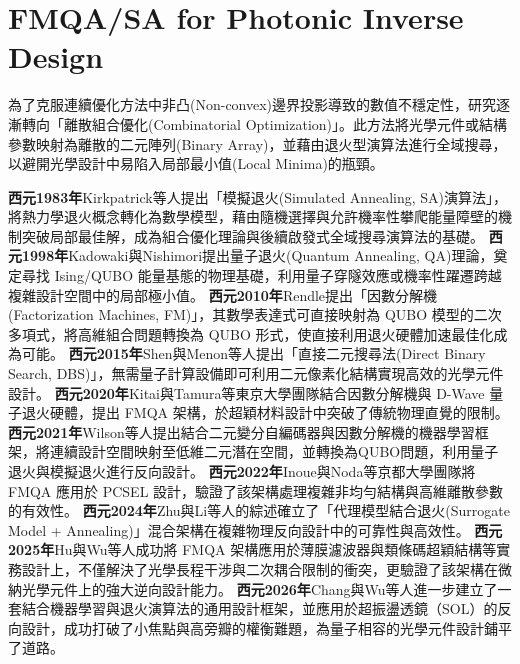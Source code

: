\section{FMQA/SA for Photonic Inverse Design}
為了克服連續優化方法中非凸(Non-convex)邊界投影導致的數值不穩定性，研究逐漸轉向「離散組合優化(Combinatorial Optimization)」。此方法將光學元件或結構參數映射為離散的二元陣列(Binary Array)，並藉由退火型演算法進行全域搜尋，以避開光學設計中易陷入局部最小值(Local Minima)的瓶頸。\

\cite{kirkpatrick1983_simulated_annealing}\textbf{西元1983年}Kirkpatrick等人提出「模擬退火(Simulated Annealing, SA)演算法」，將熱力學退火概念轉化為數學模型，藉由隨機選擇與允許機率性攀爬能量障壁的機制突破局部最佳解，成為組合優化理論與後續啟發式全域搜尋演算法的基礎。
\cite{kadowaki1998_quantum_annealing}\textbf{西元1998年}Kadowaki與Nishimori提出量子退火(Quantum Annealing, QA)理論，奠定尋找 Ising/QUBO 能量基態的物理基礎，利用量子穿隧效應或機率性躍遷跨越複雜設計空間中的局部極小值。
\cite{rendle2010_factorization}\textbf{西元2010年}Rendle提出「因數分解機(Factorization Machines, FM)」，其數學表達式可直接映射為 QUBO 模型的二次多項式，將高維組合問題轉換為 QUBO 形式，使直接利用退火硬體加速最佳化成為可能。
\cite{shen2015_integrated_pbs}\textbf{西元2015年}Shen與Menon等人提出「直接二元搜尋法(Direct Binary Search, DBS)」，無需量子計算設備即可利用二元像素化結構實現高效的光學元件設計。
\cite{kitai2020_fmqa}\textbf{西元2020年}Kitai與Tamura等東京大學團隊結合因數分解機與 D-Wave 量子退火硬體，提出 FMQA 架構，於超穎材料設計中突破了傳統物理直覺的限制。
\cite{Wilson_2021}\textbf{西元2021年}Wilson等人提出結合二元變分自編碼器與因數分解機的機器學習框架，將連續設計空間映射至低維二元潛在空間，並轉換為QUBO問題，利用量子退火與模擬退火進行反向設計。
\cite{inoue2022_fmqa_pcsel}\textbf{西元2022年}Inoue與Noda等京都大學團隊將 FMQA 應用於 PCSEL 設計，驗證了該架構處理複雜非均勻結構與高維離散參數的有效性。
\cite{zhu2024_machine_learning}\textbf{西元2024年}Zhu與Li等人的綜述確立了「代理模型結合退火(Surrogate Model + Annealing)」混合架構在複雜物理反向設計中的可靠性與高效性。
\cite{hu2025_optical_filter}\textbf{西元2025年}Hu與Wu等人成功將 FMQA 架構應用於薄膜濾波器與類條碼超穎結構等實務設計上，不僅解決了光學長程干涉與二次耦合限制的衝突，更驗證了該架構在微納光學元件上的強大逆向設計能力。
\cite{chang2026_quantum_compatible}\textbf{西元2026年}Chang與Wu等人進一步建立了一套結合機器學習與退火演算法的通用設計框架，並應用於超振盪透鏡（SOL）的反向設計，成功打破了小焦點與高旁瓣的權衡難題，為量子相容的光學元件設計鋪平了道路。

